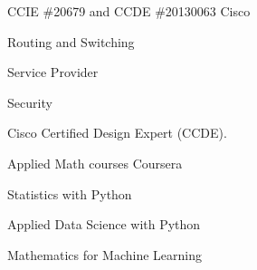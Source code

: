 
\begin{cventries}

  \cventry
    {CCIE \#20679 and CCDE \#20130063} %
    {Cisco} %
    {} %
    {} %
    {  \begin{cvitems} %
        \item {Routing and Switching}
        \item {Service Provider}
        \item {Security}
        \item {Cisco Certified Design Expert (CCDE).}
      \end{cvitems}
    }



  \cventry
    {Applied Math courses} %
    {Coursera} %
    { } %
    { } %
    {  \begin{cvitems} %
        \item {Statistics with Python}
        \item {Applied Data Science with Python}
        \item {Mathematics for Machine Learning}
      \end{cvitems}
    }
\end{cventries}
